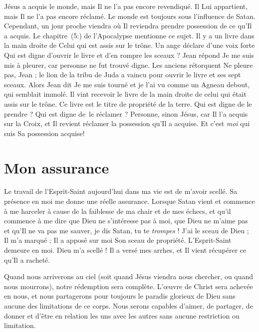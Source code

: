 Jésus a acquis le monde, mais Il ne l'a pas encore revendiqué.
 Il Lui appartient, mais Il ne l'a pas encore réclamé.
 Le monde est toujours sous l'influence de Satan.
 Cependant, un jour proche viendra où Il reviendra prendre possession
 de ce qu'Il a acquis.
 Le chapitre~(5:) de l'Apocalypse mentionne ce sujet.
 Il y a un livre dans la main droite de Celui qui est assis sur le trône.
 Un ange déclare d'une voix forte\frcolon{}
 \Og Qui est digne d'ouvrir le livre et d'en rompre les sceaux ? \Fg{}
 Jean répond\frcolon{} \Og Je me suis mis à pleurer,
 car personne ne fut trouvé digne. \Fg{}
 Les anciens rétorquent\frcolon{} \Og Ne pleure pas, Jean ;
 le lion de la tribu de Juda a vaincu pour ouvrir
 le livre et ses sept sceaux. \Fg{}
 Alors Jean dit\frcolon{} \Og Je me suis tourné et je l'ai vu comme un Agneau debout,
 qui semblait immolé. Il vint recevoir le livre de la main droite
 de celui qui était assis sur le trône. \Fg{}
 Ce livre est le titre de propriété de la terre.
 Qui est digne de le prendre ? Qui est digne de~le réclamer ?
 Personne, sinon Jésus, car Il l'a acquis sur la Croix, et Il revient
 réclamer la possession qu'Il a acquise.
 Et c'est \emph{moi} qui suis Sa possession acquise!


\section{Mon assurance}

Le travail de l'Esprit-Saint aujourd'hui dans ma vie est de m'avoir scellé.
 Sa présence en moi me donne une réelle assurance.
 Lorsque Satan  vient et commence à me harceler à cause
 de la faiblesse de ma chair et de mes échecs,
 et qu'il commence à me dire que Dieu
 ne s'intéresse pas à moi, que Dieu ne m'aime pas et qu'Il ne va pas
 me sauver, je dis\frcolon{}
 \Og Satan, tu te \emph{trompes} ! J'ai le sceau de Dieu ; Il m'a marqué ;
 Il a apposé sur moi Son sceau de propriété. L'Esprit-Saint demeure en moi.
 Dieu m'a scellé ! Il a versé mes arrhes, et Il vient récupérer
 ce qu'Il a racheté. \Fg{}

Quand nous arriverons au ciel (soit quand Jésus viendra nous chercher,
 ou quand nous mourrons), notre rédemption sera complète.
 L'œu\-vre de Christ sera achevée en nous, et nous partagerons pour
 toujours le paradis glorieux de Dieu sans aucune des limitations
 de ce corps. Nous serons capables d'aimer, de partager, de donner
 et d'être en relation les uns avec les autres sans aucune restriction
 ou limitation.

